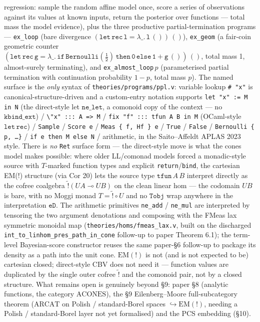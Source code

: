 regression: sample the random affine model once, score a series of
observations against its values at known inputs, return the
posterior over functions --- total mass the model evidence),
plus the three productive partial-termination programs ---
\texttt{ex\_loop} (bare divergence
$\mathtt{(let\,rec\,l = \lambda\_.\,l\,())\,()}$),
\texttt{ex\_geom} (a fair-coin geometric counter
$\mathtt{(let\,rec\,g = \lambda\_.\,if\,Bernoulli(\tfrac12)\,then\,0\,
else\,1 + g\,())\,()}$, total mass 1, almost-surely terminating), and
\texttt{ex\_almost\_loop}\,$p$ (parameterised partial termination with
continuation probability $1 - p$, total mass $p$). The named surface is
the \emph{only} syntax of \texttt{theories/programs/ppl.v}: variable
lookup \texttt{\#~"x"} is canonical-structure-driven and a custom-entry
notation supports
\texttt{let "x" := M in N} (the direct-style let $\mathtt{ne\_let}$,
a comonoid copy of the context --- no $\mathtt{kbind\_ext}$)
/ \texttt{\textbackslash "x" ::: A => M}
/ \texttt{fix "f" ::: tfun A B in M} (OCaml-style $\mathtt{let\,rec}$)
/ \texttt{Sample} / \texttt{Score e} / \texttt{Meas \{ f, Hf \} e}
/ \texttt{True} / \texttt{False} / \texttt{Bernoulli \{ p, \ldots \}}
/ \texttt{if e then M else N}
/ arithmetic, in the Saito--Affeldt APLAS 2023 style. There is
\emph{no} \texttt{Ret} surface form --- the direct-style move is what
the cones model makes possible: where older LL/comonad models forced a
monadic-style source with $T$-marked function types and explicit
\texttt{return}/\texttt{bind}, the cartesian EM(!) structure (via
Cor 20) lets the source type $\mathtt{tfun}\,A\,B$ interpret directly as
the cofree coalgebra $\widetilde{\mathord{!}}(U A \multimap U B)$ on the
clean linear hom --- the codomain $U B$ is bare, with no Moggi monad
$T = \widetilde{\mathord{!}} \circ U$ and no $\mathtt{Tobj}$ wrap
anywhere in the interpretation $\mathtt{eD}$.
The arithmetic primitives \texttt{ne\_add} / \texttt{ne\_mul} are
interpreted by tensoring the two argument denotations and composing
with the FMeas lax symmetric monoidal map
(\texttt{theories/homs/fmeas\_lax.v}, built on the discharged
\texttt{int\_to\_linhom\_pres\_path\_in\_cone} follow-up to paper
Theorem 6.1); the term-level Bayesian-score constructor reuses
the same paper-\S6 follow-up to package its density as a path into
the unit cone. $\mathrm{EM}(\mathord{!})$ is not (and is not expected
to be) cartesian closed; direct-style CBV does not need it --- function
values are duplicated by the single outer cofree
$\widetilde{\mathord{!}}$ and the comonoid pair, not by a closed
structure. What remains open is
genuinely beyond \S9: paper
\S8 (analytic functions, the category $\mathrm{ACONES}$), the \S9
Eilenberg–Moore full-subcategory theorem ($\mathrm{ARCAT}$ on Polish /
standard-Borel spaces $\hookrightarrow \mathrm{EM}(\mathord{!})$,
needing a Polish / standard-Borel layer not yet formalised) and the
PCS embedding (\S10).

